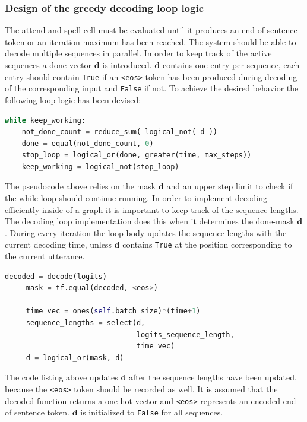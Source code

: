 \subsubsection{Design of the greedy decoding loop logic}
The attend and spell cell must be evaluated until it produces an end of sentence token or an iteration maximum has been reached. The system should be able to decode multiple sequences in parallel. In order to keep track of the active sequences a done-vector $\mathbf{d}$ is introduced.  $\mathbf{d}$ contains one entry per sequence, each entry should contain \texttt{True} if an \texttt{<eos>} token has been produced during decoding of the corresponding input and \texttt{False} if not. 
To achieve the desired behavior the following loop logic has been devised:
\begin{lstlisting}[language=python]
while keep_working:
	not_done_count = reduce_sum( logical_not( d ))
	done = equal(not_done_count, 0)
	stop_loop = logical_or(done, greater(time, max_steps))
	keep_working = logical_not(stop_loop)
\end{lstlisting}
The pseudocode above relies on the mask $\mathbf{d}$ and an upper step limit to check if the while loop should continue running. In order to implement decoding efficiently inside of a graph it is important to keep track of the sequence lengths. The decoding loop implementation does this when it determines the done-mask $\mathbf{d}$. During every iteration the loop body updates the sequence lengths with the current decoding time, unless $\mathbf{d}$ contains \texttt{True} at the position corresponding to the current utterance.
\begin{lstlisting}[language=python]
     decoded = decode(logits)
     mask = tf.equal(decoded, <eos>)

     time_vec = ones(self.batch_size)*(time+1)
     sequence_lengths = select(d,
                               logits_sequence_length,
                               time_vec)
     d = logical_or(mask, d)
\end{lstlisting}
The code listing above updates $\mathbf{d}$ after the sequence lengths have been updated, because the \texttt{<eos>} token should be recorded as well. It is assumed that the decoded function returns a one hot vector and \texttt{<eos>} represents an encoded end of sentence token. $\mathbf{d}$ is initialized to \texttt{False} for all sequences. 

